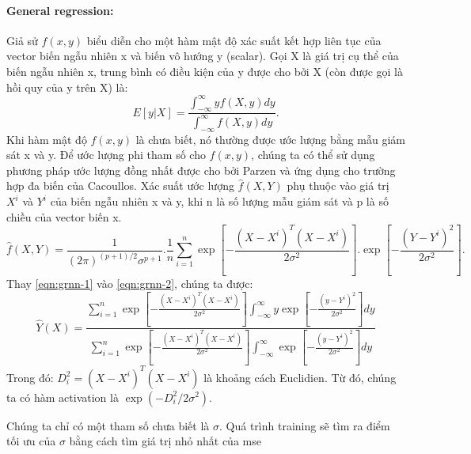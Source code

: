 \paragraph{General regression:} Giả sử $f(x, y)$ biểu diễn cho một hàm mật độ xác suất kết hợp liên tục của vector biến ngẫu nhiên x và biến vô hướng y (scalar). Gọi X là giá trị cụ thể của biến ngẫu nhiên x, trung bình có điều kiện của y được cho bởi X (còn được gọi là hồi quy của y trên X) là:
\begin{equation}
\label{eqn:grnn-1}
E[y|X] = \frac{\int _{-\infty}^{\infty}yf(X, y)dy}{\int _{-\infty}^{\infty}f(X, y)dy}.
\end{equation}
Khi hàm mật độ $f(x, y)$ là chưa biết, nó thường được ước lượng bằng mẫu giám sát x và y. Để ước lượng phi tham số cho $f(x, y)$, chúng ta có thể sử dụng phương pháp ước lượng đồng nhất được cho bởi Parzen và ứng dụng cho trường hợp đa biến của Cacoullos. Xác suất ước lượng $\hat f(X, Y)$ phụ thuộc vào giá trị $X^i$ và $Y^i$ của biến ngẫu nhiên x và y, khi n là số lượng mẫu giám sát và p là số chiều của vector biến x.
\begin{equation}
\label{eqn:grnn-2}
\hat f(X, Y) = \frac{1}{(2\pi)^{(p+1)/2}\sigma^{p+1}}.\frac{1}{n}\sum^n_{i=1}\exp[-\frac{{(X-X^i)}^T(X-X^i)}{2\sigma^2}].\exp[-\frac{{(Y-Y^i)}^2}{2\sigma^2}].
\end{equation}
Thay \ref{eqn:grnn-1} vào \ref{eqn:grnn-2}, chúng ta được:
\begin{equation}
\label {eqn:grnn-3}
\hat Y(X) = \frac{\sum_{i=1}^n\exp[-\frac{{(X-X^i)}^T(X-X^i)}{2\sigma^2}]\int _{-\infty}^{\infty}y\exp[-\frac{{(y-Y^i)}^2}{2\sigma^2}]dy}{\sum_{i=1}^n\exp[-\frac{{(X-X^i)}^T(X-X^i)}{2\sigma^2}]\int _{-\infty}^{\infty}\exp[-\frac{{(y-Y^i)}^2}{2\sigma^2}]dy}
\end{equation}
Trong đó: $D^2_i = {(X-X^i)}^T(X-X^i)$ là khoảng cách Euclidien. Từ đó, chúng ta có hàm activation là $\exp(-D^2_i/2\sigma^2)$. 

Chúng ta chỉ có một tham số chưa biết là $\sigma$. Quá trình training sẽ tìm ra điểm tối ưu của $\sigma$ bằng cách tìm giá trị nhỏ nhất của \ac{mse} \cite{grnn_github}
